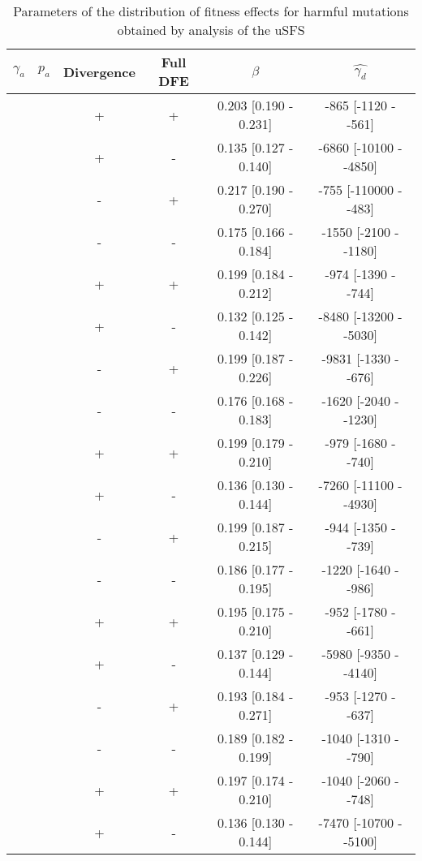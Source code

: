 
\begin{table}
   \centering
   \begin{threeparttable}[b]
\caption{Parameters of the distribution of fitness effects for harmful mutations obtained by analysis of the uSFS }

\begin{tabular}{cccccc}
\toprule
$\gamma_a$ & $p_a$ & Divergence\tnote{a} & Full DFE\tnote{b} & $\beta$\tnote{c} & $\hat{\gamma_d}$ \tnote{c} \\
\midrule
 &&        + &        + &  0.203 [0.190 - 0.231] &  -865 [-1120 -  -561] \\
 &&        + &        - &  0.135 [0.127 - 0.140] & -6860 [-10100 -  -4850] \\
 &&        - &        + &  0.217 [0.190 - 0.270] &  -755 [-110000 -  -483] \\
 &&        - &        - &  0.175 [0.166 - 0.184] & -1550 [-2100 -  -1180] \\
 &&        + &        + &  0.199 [0.184 - 0.212] &  -974 [-1390 -  -744] \\
 &&        + &        - &  0.132 [0.125 - 0.142] & -8480 [-13200 -  -5030] \\
 &&        - &        + &  0.199 [0.187 - 0.226] & -9831 [-1330 -  -676] \\
 &&        - &        - &  0.176 [0.168 - 0.183] & -1620 [-2040 -  -1230] \\
 &&        + &        + &  0.199 [0.179 - 0.210] &  -979 [-1680 -  -740] \\
 &&        + &        - &  0.136 [0.130 - 0.144] & -7260 [-11100 -  -4930] \\
 &&        - &        + &  0.199 [0.187 - 0.215] &  -944 [-1350 -  -739] \\
   &&      - &        - &  0.186 [0.177 - 0.195] & -1220 [-1640 -  -986] \\
     &&    + &        + &  0.195 [0.175 - 0.210] &  -952 [-1780 -  -661] \\
       &&  + &        - &  0.137 [0.129 - 0.144] & -5980 [-9350 -  -4140] \\
         &&- &        + &  0.193 [0.184 - 0.271] &  -953 [-1270 -  -637] \\
&&         - &        - &  0.189 [0.182 - 0.199] & -1040 [-1310 -  -790] \\
  &&       + &        + &  0.197 [0.174 - 0.210] & -1040 [-2060 -  -748] \\
    &&     + &        - &  0.136 [0.130 - 0.144] & -7470 [-10700 -  -5100] \\

\end{tabular}
\end{threeparttable}
\end{table}
